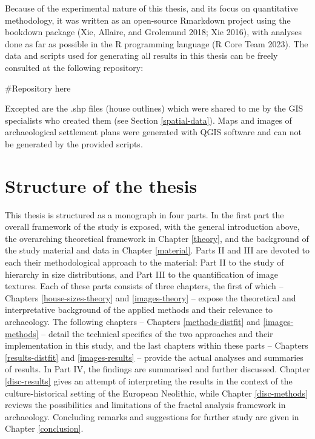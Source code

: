 \documentclass[
  12pt,
  a4paper, twoside]{book}
\begin{document}
Because of the experimental nature of this thesis, and its focus on quantitative methodology, it was written as an open-source Rmarkdown project using the bookdown package (Xie, Allaire, and Grolemund 2018; Xie 2016), with analyses done as far as possible in the R programming language (R Core Team 2023). The data and scripts used for generating all results in this thesis can be freely consulted at the following repository:

\#Repository here

Excepted are the .shp files (house outlines) which were shared to me by the GIS specialists who created them (see Section \ref{spatial-data}). Maps and images of archaeological settlement plans were generated with QGIS software and can not be generated by the provided scripts.

\hypertarget{structure-of-the-thesis}{%
\section{Structure of the thesis}\label{structure-of-the-thesis}}

This thesis is structured as a monograph in four parts. In the first part the overall framework of the study is exposed, with the general introduction above, the overarching theoretical framework in Chapter \ref{theory}, and the background of the study material and data in Chapter \ref{material}. Parts II and III are devoted to each their methodological approach to the material: Part II to the study of hierarchy in size distributions, and Part III to the quantification of image textures. Each of these parts consists of three chapters, the first of which -- Chapters \ref{house-sizes-theory} and \ref{images-theory} -- expose the theoretical and interpretative background of the applied methods and their relevance to archaeology. The following chapters -- Chapters \ref{methods-distfit} and \ref{images-methods} -- detail the technical specifics of the two approaches and their implementation in this study, and the last chapters within these parts -- Chapters \ref{results-distfit} and \ref{images-results} -- provide the actual analyses and summaries of results. In Part IV, the findings are summarised and further discussed. Chapter \ref{disc-results} gives an attempt of interpreting the results in the context of the culture-historical setting of the European Neolithic, while Chapter \ref{disc-methods} reviews the possibilities and limitations of the fractal analysis framework in archaeology. Concluding remarks and suggestions for further study are given in Chapter \ref{conclusion}.
\end{document}
